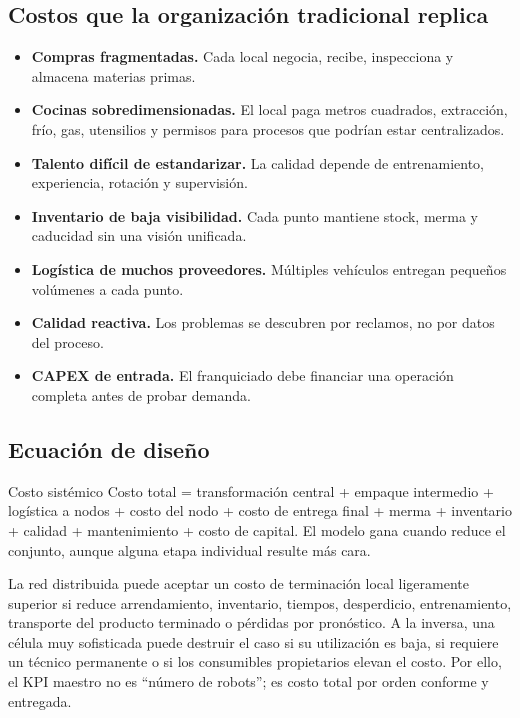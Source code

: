 \documentclass[11pt,a4paper]{article}
\begin{document}
\subsection{Costos que la organización tradicional replica}
\begin{itemize}
\item \textbf{Compras fragmentadas.} Cada local negocia, recibe, inspecciona y almacena materias primas.
\item \textbf{Cocinas sobredimensionadas.} El local paga metros cuadrados, extracción, frío, gas,
utensilios y permisos para procesos que podrían estar centralizados.
\item \textbf{Talento difícil de estandarizar.} La calidad depende de entrenamiento, experiencia, rotación
y supervisión.
\item \textbf{Inventario de baja visibilidad.} Cada punto mantiene stock, merma y caducidad sin una visión
unificada.
\item \textbf{Logística de muchos proveedores.} Múltiples vehículos entregan pequeños volúmenes a cada
punto.
\item \textbf{Calidad reactiva.} Los problemas se descubren por reclamos, no por datos del proceso.
\item \textbf{CAPEX de entrada.} El franquiciado debe financiar una operación completa antes de probar
demanda.
\end{itemize}

\subsection{Ecuación de diseño}
\begin{caja}{Costo sistémico}
Costo total = transformación central + empaque intermedio + logística a nodos + costo del nodo + costo de
entrega final + merma + inventario + calidad + mantenimiento + costo de capital. El modelo gana cuando
reduce el conjunto, aunque alguna etapa individual resulte más cara.
\end{caja}

La red distribuida puede aceptar un costo de terminación local ligeramente superior si reduce
arrendamiento, inventario, tiempos, desperdicio, entrenamiento, transporte del producto terminado o
pérdidas por pronóstico. A la inversa, una célula muy sofisticada puede destruir el caso si su utilización
es baja, si requiere un técnico permanente o si los consumibles propietarios elevan el costo. Por ello, el
KPI maestro no es “número de robots”; es costo total por orden conforme y entregada.
\end{document}
